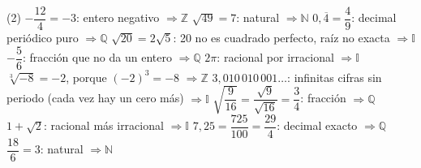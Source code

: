 \documentclass[11pt,a4paper]{article}
\newcommand{\res}[1]{\boxed{#1}}
\begin{document}
\begin{tasks}(2)
  \task $-\dfrac{12}{4}=-3$: entero negativo $\Rightarrow\res{\mathbb{Z}}$
  \task $\sqrt{49}=7$: natural $\Rightarrow\res{\mathbb{N}}$
  \task $0,\overline{4}=\dfrac49$: decimal periódico puro $\Rightarrow\res{\mathbb{Q}}$
  \task $\sqrt{20}=2\sqrt5$: 20 no es cuadrado perfecto, raíz no exacta $\Rightarrow\res{\mathbb{I}}$
  \task $-\dfrac56$: fracción que no da un entero $\Rightarrow\res{\mathbb{Q}}$
  \task $2\pi$: racional por irracional $\Rightarrow\res{\mathbb{I}}$
  \task $\sqrt[3]{-8}=-2$, porque $(-2)^{3}=-8$ $\Rightarrow\res{\mathbb{Z}}$
  \task $3,010\,010\,001\ldots$: infinitas cifras sin periodo (cada vez hay un cero más) $\Rightarrow\res{\mathbb{I}}$
  \task $\sqrt{\dfrac{9}{16}}=\dfrac{\sqrt9}{\sqrt{16}}=\dfrac34$: fracción $\Rightarrow\res{\mathbb{Q}}$
  \task $1+\sqrt2$: racional más irracional $\Rightarrow\res{\mathbb{I}}$
  \task $7,25=\dfrac{725}{100}=\dfrac{29}{4}$: decimal exacto $\Rightarrow\res{\mathbb{Q}}$
  \task $\dfrac{18}{6}=3$: natural $\Rightarrow\res{\mathbb{N}}$
\end{tasks}
\end{document}
